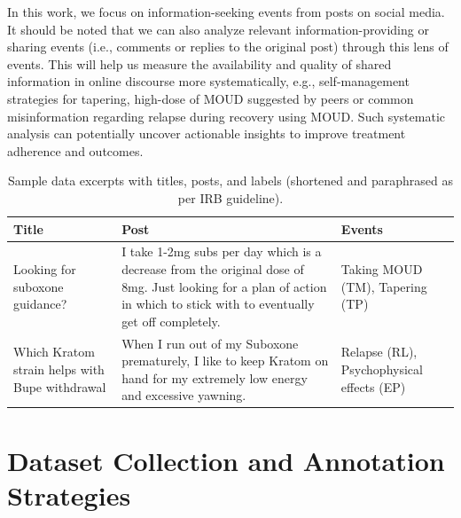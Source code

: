 \documentclass[letterpaper]{article}
\begin{document}
In this work, we focus on information-seeking events from posts on social media. It should be noted that we can also analyze relevant information-providing or sharing events (i.e., comments or replies to the original post) through this lens of events. This will help us measure the availability and quality of shared information in online discourse more systematically, e.g., self-management strategies for tapering, high-dose of MOUD suggested by peers or common misinformation regarding relapse during recovery using MOUD.
Such systematic analysis can potentially uncover actionable insights to improve treatment adherence and outcomes.



\begin{table}[ht!]
\centering
\footnotesize
\begin{tabular}{L{3.5cm} L{10.5cm} C{2.8cm} }
\hline
\textbf{Title}&\textbf{Post}&\textbf{Events}\\
\hline
Looking for suboxone guidance? & I take 1-2mg subs per day which is a decrease from the original dose of 8mg. Just looking for a plan of action in which to stick with to eventually get off completely. & Taking MOUD (TM), Tapering (TP) \\
\midrule
 Which Kratom strain helps with Bupe withdrawal & When I run out of my Suboxone prematurely, I like to keep Kratom on hand for my extremely low energy and excessive yawning. & Relapse (RL), Psychophysical effects (EP) \\
\hline

\end{tabular}
\caption{Sample data excerpts with titles, posts, and labels (shortened and paraphrased as per IRB guideline).}
\label{samples}
\end{table}

\section{Dataset Collection and Annotation Strategies}
\end{document}
